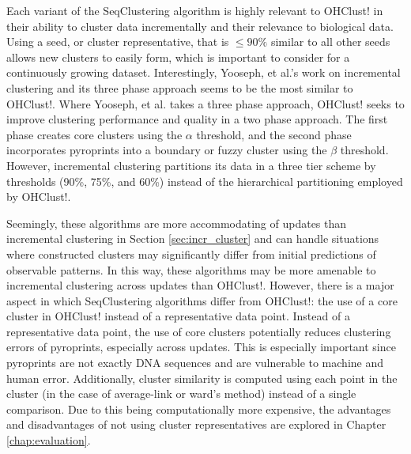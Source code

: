 \documentclass[12pt]{ucthesis}
\begin{document}
   Each variant of the SeqClustering algorithm is highly relevant to \textsf{OHClust!}
   in their ability to cluster data incrementally and their relevance to
   biological data. Using a seed, or cluster representative, that is $\le 90\%$
   similar to all other seeds allows new clusters to easily form, which is
   important to consider for a continuously growing dataset. Interestingly,
   Yooseph, et al.'s work on incremental clustering and its three phase
   approach seems to be the most similar to \textsf{OHClust!}. Where Yooseph, et al.
   takes a three phase approach, \textsf{OHClust!} seeks to improve clustering
   performance and quality in a two phase approach. The first phase creates
   core clusters using the $\alpha$ threshold, and the second phase
   incorporates pyroprints into a boundary or fuzzy cluster using the $\beta$
   threshold. However, incremental clustering partitions its data in a three
   tier scheme by thresholds (90\%, 75\%, and 60\%) instead of the hierarchical
   partitioning employed by \textsf{OHClust!}.

   Seemingly, these algorithms are more accommodating of updates than
   incremental clustering in Section \ref{sec:incr_cluster} and can handle
   situations where constructed clusters may significantly differ from initial
   predictions of observable patterns. In this way, these algorithms may be
   more amenable to incremental clustering across updates than \textsf{OHClust!}.
   However, there is a major aspect in which SeqClustering algorithms differ
   from \textsf{OHClust!}: the use of a core cluster in \textsf{OHClust!} instead of a
   representative data point. Instead of a representative data point, the use
   of core clusters potentially reduces clustering errors of pyroprints,
   especially across updates. This is especially important since pyroprints are
   not exactly DNA sequences and are vulnerable to machine and human error.
   Additionally, cluster similarity is computed using each point in the cluster
   (in the case of average-link or ward's method) instead of a single
   comparison. Due to this being computationally more expensive, the advantages
   and disadvantages of not using cluster representatives are explored in
   Chapter \ref{chap:evaluation}.
\end{document}
